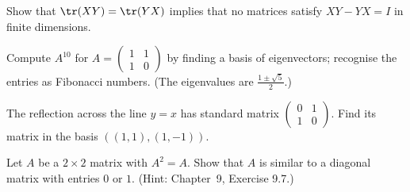 \begin{exercise}
Show that $\tr(XY)=\tr(YX)$ implies that no matrices satisfy $XY-YX=I$ in finite dimensions.
\end{exercise}

\begin{exercise}
Compute $A^{10}$ for $A=\begin{pmatrix}1&1\\1&0\end{pmatrix}$ by finding a basis of eigenvectors; recognise the entries as Fibonacci numbers. (The eigenvalues are $\tfrac{1\pm\sqrt5}2$.)
\end{exercise}

\begin{exercise}
The reflection across the line $y=x$ has standard matrix $\begin{pmatrix}0&1\\1&0\end{pmatrix}$. Find its matrix in the basis $((1,1),(1,-1))$.
\end{exercise}

\begin{exercise}
Let $A$ be a $2\times2$ matrix with $A^2=A$. Show that $A$ is similar to a diagonal matrix with entries $0$ or $1$. (Hint: Chapter~9, Exercise 9.7.)
\end{exercise}
